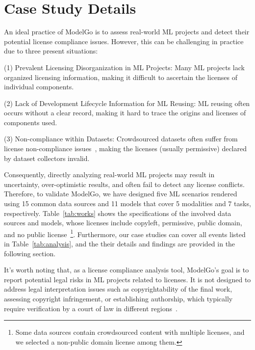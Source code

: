 \section{Case Study Details}
\label{sec:case}
An ideal practice of ModelGo is to assess real-world ML projects and detect their potential license compliance issues. 
However, this can be challenging in practice due to three present situations:

(1) Prevalent Licensing Disorganization in ML Projects: Many ML projects lack organized licensing information, making it difficult to ascertain the licenses of individual components.

(2) Lack of Development Lifecycle Information for ML Reusing: ML reusing often occurs without a clear record, making it hard to trace the origins and licenses of components used.

(3) Non-compliance within Datasets: Crowdsourced datasets often suffer from license non-compliance issues~\cite{rajbahadur2021can}, making the licenses (usually permissive) declared by dataset collectors invalid.

Consequently, directly analyzing real-world ML projects may result in uncertainty, over-optimistic results, and often fail to detect any license conflicts.
Therefore, to validate ModelGo, we have designed five ML scenarios rendered using 15 common data sources and 11 models that cover 5 modalities and 7 tasks, respectively.
Table~\ref{tab:works} shows the specifications of the involved data sources and models, whose licenses include copyleft, permissive, public domain, and no public license~\footnote{Some data sources contain crowdsourced content with multiple licenses, and we selected a non-public domain license among them.}.
Furthermore, our case studies can cover all events listed in Table~\ref{tab:analysis}, and the their details and findings are provided in the following section.

It's worth noting that, as a license compliance analysis tool, ModelGo's goal is to report potential legal risks in ML projects related to licenses.
It is not designed to address legal interpretation issues such as copyrightability of the final work, assessing copyright infringement, or establishing authorship, which typically require verification by a court of law in different regions~\cite{national1979final, hedrick2019ithink, margoni2018artificial}.


